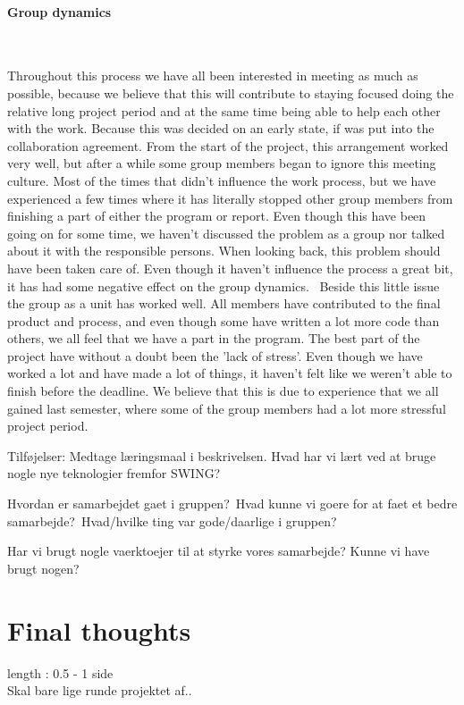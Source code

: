 \documentclass[a4paper,10pt,titlepage]{article}
\begin{document}
		\paragraph{Group dynamics}\mbox{}\
		
		Throughout this process we have all been interested in meeting as much as possible, because we believe that this will contribute to staying focused doing the relative long project period and at the same time being able to help each other with the work. Because this was decided on an early state, if was put into the collaboration agreement. From the start of the project, this arrangement worked very well, but after a while some group members began to ignore this meeting culture. Most of the times that didn't influence the work process, but we have experienced a few times where it has literally stopped other group members from finishing a part of either the program or report. Even though this have been going on for some time, we haven't discussed the problem as a group nor talked about it with the responsible persons. When looking back, this problem should have been taken care of. Even though it haven't influence the process a great bit, it has had some negative effect on the group dynamics. \
		Beside this little issue the group as a unit has worked well. All members have contributed to the final product and process, and even though some have written a lot more code than others, we all feel that we have a part in the program. The best part of the project have without a doubt been the 'lack of stress'. Even though we have worked a lot and have made a lot of things, it haven't felt like we weren't able to finish before the deadline. We believe that this is due to experience that we all gained last semester, where some of the group members had a lot more stressful project period.  
		
		
		Tilføjelser:
		Medtage læringsmaal i beskrivelsen. 
		Hvad har vi lært ved at bruge nogle nye teknologier fremfor SWING?
		
		Hvordan er samarbejdet gaet i gruppen?\
		Hvad kunne vi goere for at faet et bedre samarbejde?\
		Hvad/hvilke ting var gode/daarlige i gruppen?\
		
		Har vi brugt nogle vaerktoejer til at styrke vores samarbejde? Kunne vi have brugt nogen?\
		
	\newpage
	\section{Final thoughts}
		length : 0.5 - 1 side\\
		Skal bare lige runde projektet af..
	
\end{document}
